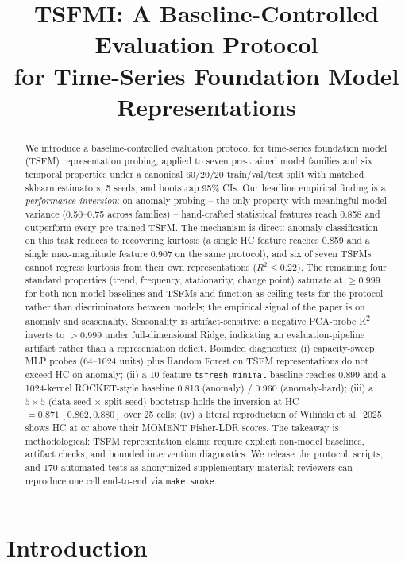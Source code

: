 \documentclass{article}
\title{TSFMI: A Baseline-Controlled Evaluation Protocol\\ for Time-Series Foundation Model Representations}
\begin{document}
\maketitle

\begin{abstract}
We introduce a baseline-controlled evaluation protocol for time-series foundation model (TSFM) representation probing, applied to seven pre-trained model families and six temporal properties under a canonical 60/20/20 train/val/test split with matched sklearn estimators, 5 seeds, and bootstrap 95\% CIs. Our headline empirical finding is a \emph{performance inversion}: on anomaly probing -- the only property with meaningful model variance (0.50--0.75 across families) -- hand-crafted statistical features reach 0.858 and outperform every pre-trained TSFM. The mechanism is direct: anomaly classification on this task reduces to recovering kurtosis (a single HC feature reaches 0.859 and a single max-magnitude feature 0.907 on the same protocol), and six of seven TSFMs cannot regress kurtosis from their own representations ($R^2 \leq 0.22$). The remaining four standard properties (trend, frequency, stationarity, change point) saturate at $\geq 0.999$ for both non-model baselines and TSFMs and function as ceiling tests for the protocol rather than discriminators between models; the empirical signal of the paper is on anomaly and seasonality. Seasonality is artifact-sensitive: a negative PCA-probe R\textsuperscript{2} inverts to $>0.999$ under full-dimensional Ridge, indicating an evaluation-pipeline artifact rather than a representation deficit. Bounded diagnostics: (i) capacity-sweep MLP probes (64--1024 units) plus Random Forest on TSFM representations do not exceed HC on anomaly; (ii) a 10-feature \texttt{tsfresh-minimal} baseline reaches 0.899 and a 1024-kernel ROCKET-style baseline 0.813 (anomaly) / 0.960 (anomaly-hard); (iii) a $5\times 5$ (data-seed $\times$ split-seed) bootstrap holds the inversion at HC $=0.871\,[0.862,0.880]$ over 25 cells; (iv) a literal reproduction of Wili\'{n}ski et al.\ 2025 shows HC at or above their MOMENT Fisher-LDR scores. The takeaway is methodological: TSFM representation claims require explicit non-model baselines, artifact checks, and bounded intervention diagnostics. We release the protocol, scripts, and 170 automated tests as anonymized supplementary material; reviewers can reproduce one cell end-to-end via \texttt{make smoke}.
\end{abstract}

\section{Introduction}
\end{document}
